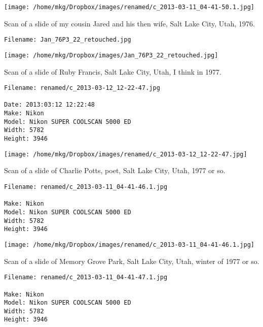\begin{landscape}

\texttt{[image: /home/mkg/Dropbox/images/renamed/c\_2013-03-11\_04-41-50.1.jpg]}
\end{landscape}



\noindent Scan of a slide of my cousin Jared and his then wife, Salt Lake City, Utah, 1976.
\begin{lstlisting}
Filename: Jan_76P3_22_retouched.jpg

\end{lstlisting}

\clearpage

\texttt{[image: /home/mkg/Dropbox/images/Jan\_76P3\_22\_retouched.jpg]}
\clearpage


\noindent Scan of a slide of Ruby Francis, Salt Lake City, Utah, I think in 1977.
\begin{lstlisting}
Filename: renamed/c_2013-03-12_12-22-47.jpg

Date: 2013:03:12 12:22:48
Make: Nikon
Model: Nikon SUPER COOLSCAN 5000 ED
Width: 5782
Height: 3946
\end{lstlisting}

\begin{landscape}

\texttt{[image: /home/mkg/Dropbox/images/renamed/c\_2013-03-12\_12-22-47.jpg]}
\end{landscape}



\noindent Scan of a slide of Charlie Potts, poet, Salt Lake City, Utah, 1977 or so.
\begin{lstlisting}
Filename: renamed/c_2013-03-11_04-41-46.1.jpg

Make: Nikon
Model: Nikon SUPER COOLSCAN 5000 ED
Width: 5782
Height: 3946
\end{lstlisting}

\begin{landscape}

\texttt{[image: /home/mkg/Dropbox/images/renamed/c\_2013-03-11\_04-41-46.1.jpg]}
\end{landscape}



\noindent Scan of a slide of Memory Grove Park, Salt Lake City, Utah, winter of 1977 or so.
\begin{lstlisting}
Filename: renamed/c_2013-03-11_04-41-47.1.jpg

Make: Nikon
Model: Nikon SUPER COOLSCAN 5000 ED
Width: 5782
Height: 3946
\end{lstlisting}

